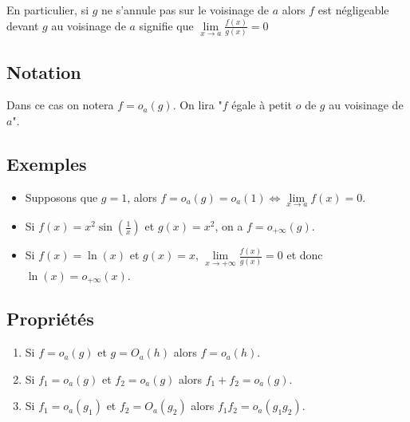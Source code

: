 \documentclass[a4paper,10pt]{book} %
\begin{document}
En particulier, si $g$ ne s'annule pas sur le voisinage de $a$ alors $f$ est négligeable devant $g$ au voisinage de $a$ signifie que $\lim\limits_{x\rightarrow a} \frac{f(x)}{g(x)}=0$

\subsection{Notation}
Dans ce cas on notera $f=o_a(g)$. On lira "$f$ égale à petit $o$ de $g$ au voisinage de $a$".

\subsection{Exemples}
\begin{itemize}[label=$\bullet$]
\item Supposons que $g=1$, alors $f=o_a(g)=o_a(1) \Leftrightarrow \lim\limits_{x\rightarrow a}f(x)=0$.
\item Si $f(x)=x^2\sin(\frac{1}{x})$ et $g(x)=x^2$, on a $f=o_{+\infty}(g)$.
\item Si $f(x)=\ln(x)$ et $g(x)=x$, $\lim\limits_{x\rightarrow +\infty} \frac{f(x)}{g(x)}=0$ et donc $\ln(x)=o_{+\infty}(x)$.
\end{itemize}

\subsection{Propriétés}
\begin{enumerate}
\item Si $f=o_a(g)$ et $g=O_a(h)$ alors $f=o_a(h)$.
\item Si $f_1=o_a(g)$ et $f_2=o_a(g)$ alors $f_1+f_2=o_a(g)$.
\item Si $f_1=o_a(g_1)$ et $f_2=O_a(g_2)$ alors $f_1f_2=o_a(g_1g_2)$.
\end{enumerate}
\end{document}
